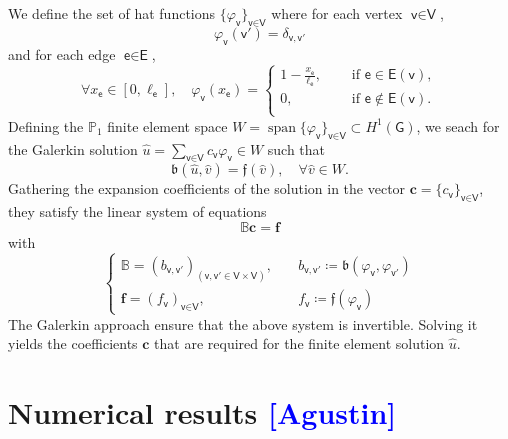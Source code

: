 \documentclass[11pt,a4paper,twoside]{article}
\theoremstyle{definition}
\numberwithin{equation}{section}
\newcommand{\bB}{\ensuremath{\mathbb{B}}}
\newcommand{\bP}{\ensuremath{\mathbb{P}}}
\newcommand{\G}{\ensuremath{\textsf{G}}} %
\newcommand{\E}{\ensuremath{\textsf{E}}} %
\newcommand{\V}{\ensuremath{\textsf{V}}} %
\newcommand{\vv}{\ensuremath{\textsf{v}}}
\newcommand{\ee}{\ensuremath{\textsf{e}}}
\newcommand{\<}{\langle}
\renewcommand{\>}{\rangle}
\newcommand{\vspan}{\operatorname{span}}
\newcommand{\om}[1]{\textcolor{blue}{#1}}
\begin{document}
We define the set of hat functions $\{\varphi_\vv\}_{\vv\in \V}$ where for each vertex $\vv\in \V$,
$$
\varphi_\vv( \vv') = \delta_{\vv, \vv'}
$$
and for each edge $\ee \in \E$,
\begin{equation}
\forall x_\ee \in [0, \ell_\ee],\quad
\varphi_\vv(x_\ee)=
\begin{cases}
1-\frac{x_\ee}{\ell_\ee}, \quad &\text{ if } \ee \in \E(\vv), \\
0 , \quad &\text{ if } \ee \not\in \E(\vv). \\
\end{cases}
\end{equation}
Defining the $\bP_1$ finite element space $W = \vspan\{\varphi_\vv\}_{\vv\in \V} \subset H^1(\G)$, we seach for the Galerkin solution $\hat u = \sum_{\vv\in \V} c_\vv \varphi_\vv \in W$ such that
$$
\mathfrak{b}(\hat u, \hat v) = \mathfrak{f} (\hat v), \quad \forall \hat v\in W.
$$
Gathering the expansion coefficients of the solution in the vector $\textbf{c} = \{c_\vv\}_{\vv\in \V}$, they satisfy the linear system of equations
$$
\bB\textbf{c} = \textbf{f}
$$
with
\begin{equation}
\begin{cases}
\bB = (b_{\vv, \vv'})_{(\vv,\vv'\in \V \times \V)}, \quad &b_{\vv, \vv'} \coloneqq \mathfrak{b}(\varphi_\vv, \varphi_{\vv'}) \\
\textbf{f} = (f_\vv)_{\vv\in \V}, \quad &f_\vv \coloneqq \mathfrak{f}(\varphi_\vv)
\end{cases}
\end{equation}
The Galerkin approach ensure that the above system is invertible. Solving it yields the coefficients $\textbf{c}$ that are required for the finite element solution $\hat u$.








\section{Numerical results \om{[Agustin]}}
\label{sec:numerical-tests}
\end{document}
